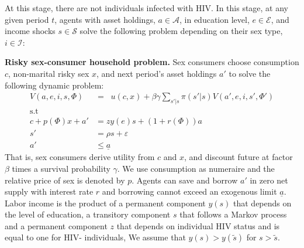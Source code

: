 At this stage, there are not individuals infected with HIV. In this stage, at any given period $t$, agents with asset holdings, $a \in \mathcal{A}$, in education level, $e \in \mathcal{E}$, and income shocks $s \in \mathcal{S}$ solve the following problem depending on their sex type, $i \in \mathcal{I}$: %

\noindent \textbf{Risky sex-consumer household problem.} Sex consumers choose consumption $c$, non-marital risky sex $x$, and next period's asset holdings $a'$ to solve the following dynamic problem:
\begin{align}
V(a,e,i,s,\Phi) &= \mathop{\max_{c\geq 0,x \geq 0,a' \geq 0}}  u(c,x) + \beta \gamma \sum_{s'|s}\pi(s'|s)V(a',e,i,s',\Phi') \label{eq:DPi}\\
\mbox{s.t}\nonumber\\
c+ p(\Phi)x +a'&= zy(e)s + (1+r(\Phi))a \label{eq:BCi}\\
s' & = \rho s + \varepsilon \label{eq:varepsilon} \\
a' &\leq \underline{a} \label{eq:borrowing}
\end{align}
 That is, sex consumers derive utility from $c$ and $x$, and discount future at factor $\beta$ times a survival probability $\gamma$. We use consumption as numeraire and the relative price of sex is denoted by $p$. Agents can save and borrow $a'$ in zero net supply with interest rate $r$ and borrowing cannot exceed an exogenous limit $\underline{a}$. Labor income is the product of a permanent component $y(s)$ that depends on the level of education, a transitory component $s$ that follows a Markov process and a permanent component $z$ that depends on individual HIV status and is equal to one for HIV- individuals, We assume that $y(s)>y(\widetilde{s})$ for $s>\widetilde{s}$. 
 
 
 
